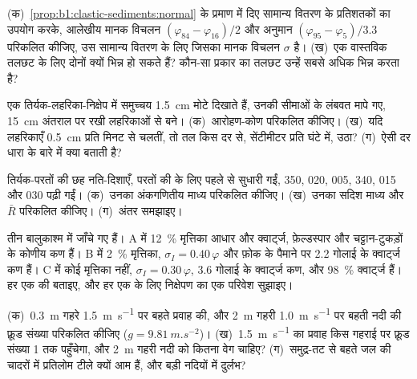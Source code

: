 \begin{exercise}[$\star\star$]\label{exo:b1:clastic-sediments:5}
(क)~\cref{prop:b1:clastic-sediments:normal} के प्रमाण में दिए सामान्य वितरण के प्रतिशतकों का उपयोग करके, आलेखीय मानक विचलन $(\varphi_{84} - \varphi_{16})/2$ और अनुमान $(\varphi_{95} - \varphi_5)/3.3$ परिकलित कीजिए, उस सामान्य वितरण के लिए जिसका मानक विचलन $\sigma$ है। (ख)~एक वास्तविक तलछट के लिए दोनों क्यों भिन्न हो सकते हैं? कौन-सा प्रकार का तलछट उन्हें सबसे अधिक भिन्न करता है?
\end{exercise}

\begin{exercise}[$\star\star$]\label{exo:b1:clastic-sediments:6}
एक तिर्यक-लहरिका-निक्षेप में समुच्चय \qty{1.5}{cm} मोटे दिखाते हैं, उनकी सीमाओं के लंबवत मापे गए, \qty{15}{cm} अंतराल पर रखी लहरिकाओं से बने। (क)~आरोहण-कोण परिकलित कीजिए। (ख)~यदि लहरिकाएँ \qty{0.5}{cm} प्रति मिनट से चलतीं, तो तल किस दर से, सेंटीमीटर प्रति घंटे में, उठा? (ग)~ऐसी दर धारा के बारे में क्या बताती है?
\end{exercise}

\begin{exercise}[$\star\star$]\label{exo:b1:clastic-sediments:7}
तिर्यक-परतों की छह नति-दिशाएँ, परतों की  के लिए पहले से सुधारी गईं, 350, 020, 005, 340, 015 और 030 पढ़ी गईं। (क)~उनका अंकगणितीय माध्य परिकलित कीजिए। (ख)~उनका सदिश माध्य और $\bar R$ परिकलित कीजिए। (ग)~अंतर समझाइए।
\end{exercise}

\begin{exercise}[$\star\star$]\label{exo:b1:clastic-sediments:8}
तीन बालुकाश्म  में जाँचे गए हैं। A में \qty{12}{\percent} मृत्तिका आधार और क्वार्ट्ज, फ़ेल्डस्पार और चट्टान-टुकड़ों के कोणीय कण हैं। B में \qty{2}{\percent} मृत्तिका, $\sigma_I = 0.40\,\varphi$ और फ़ोक के पैमाने पर \num{2.2} गोलाई के क्वार्ट्ज कण हैं। C में कोई मृत्तिका नहीं, $\sigma_I =
0.30\,\varphi$, \num{3.6} गोलाई के क्वार्ट्ज कण, और \qty{98}{\percent} क्वार्ट्ज हैं। हर एक की  बताइए, और हर एक के लिए निक्षेपण का एक परिवेश सुझाइए।
\end{exercise}

\begin{exercise}[$\star\star$]\label{exo:b1:clastic-sediments:9}
(क)~\qty{0.3}{m} गहरे \qty{1.5}{m.s^{-1}} पर बहते प्रवाह की, और \qty{2}{m} गहरी \qty{1.0}{m.s^{-1}} पर बहती नदी की फ़्रूड संख्या परिकलित कीजिए ($g
= \qty{9.81}{m.s^{-2}}$)। (ख)~\qty{1.5}{m.s^{-1}} का प्रवाह किस गहराई पर फ़्रूड संख्या 1 तक पहुँचेगा, और \qty{2}{m} गहरी नदी को कितना वेग चाहिए? (ग)~समुद्र-तट से बहते जल की चादरों में प्रतिलोम टीले क्यों आम हैं, और बड़ी नदियों में दुर्लभ?
\end{exercise}

